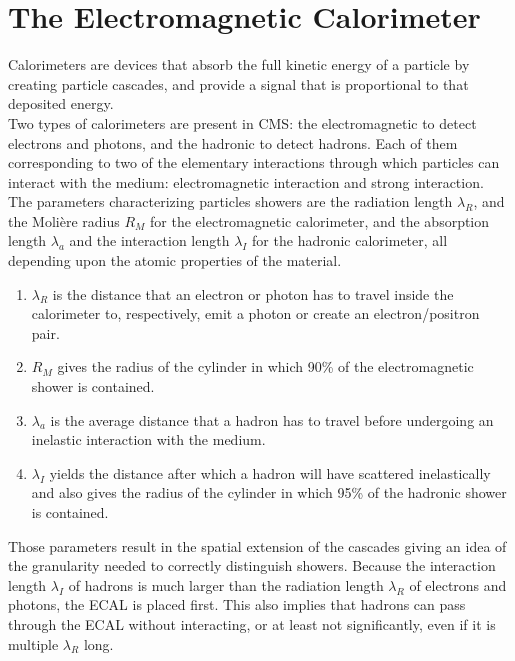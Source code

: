   \section{The Electromagnetic Calorimeter}

  Calorimeters are devices that absorb the full kinetic energy of a particle by creating particle cascades, and provide a signal that is proportional to that deposited energy. \\

  Two types of calorimeters are present in CMS: the electromagnetic to detect electrons and photons, and the hadronic to detect hadrons. Each of them corresponding to two of the elementary interactions through which particles can interact with the medium: electromagnetic interaction and strong interaction. \\

  The parameters characterizing particles showers are the radiation length $ \lambda_R $, and the Molière radius $ R_M $ for the electromagnetic calorimeter, and the absorption length $ \lambda_a $ and the interaction length $ \lambda_I $ for the hadronic calorimeter, all depending upon the atomic properties of the material.
  \begin{enumerate}
    \item[] $ \lambda_R $ is the distance that an electron or photon has to travel inside the calorimeter to, respectively, emit a photon or create an electron/positron pair.
    \item[] $ R_M $ gives the radius of the cylinder in which 90\% of the electromagnetic shower is contained.
    \item[] $ \lambda_a $ is the average distance that a hadron has to travel before undergoing an inelastic interaction with the medium.
    \item[] $ \lambda_I $ yields the distance after which a hadron will have scattered inelastically and also gives the radius of the cylinder in which 95\% of the hadronic shower is contained.
  \end{enumerate}
  Those parameters result in the spatial extension of the cascades giving an idea of the granularity needed to correctly distinguish showers. Because the interaction length $ \lambda_I $ of hadrons is much larger than the radiation length $ \lambda_R $ of electrons and photons, the ECAL is placed first. This also implies that hadrons can pass through the ECAL without interacting, or at least not significantly, even if it is multiple $ \lambda_R $ long. \\

